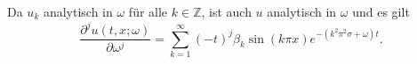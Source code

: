 Da $u_{k}$ analytisch in $\omega$ für alle $k \in \mathbb{Z}$, ist auch $u$ analytisch in $\omega$ und es gilt
\begin{equation}
    \frac{\partial^{j} u(t, x; \omega)}{\partial \omega^{j}} = \sum_{k = 1}^{\infty} (-t)^{j} \beta_{k} \sin(k \pi x) e^{-(k^{2} \pi^{2} \sigma + \omega)t}.
\end{equation}
